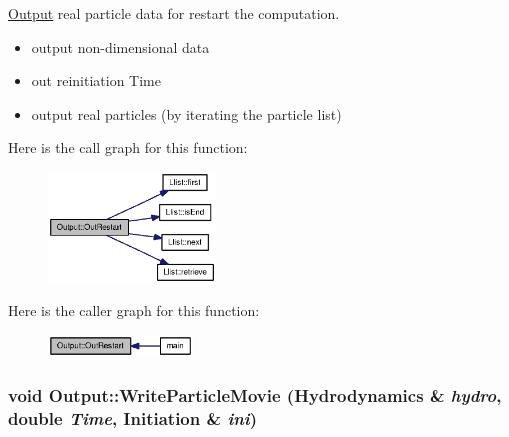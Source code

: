 \hyperlink{classOutput}{Output} real particle data for restart the computation. 



\begin{itemize}
\item output non-dimensional data\end{itemize}


\begin{itemize}
\item out reinitiation Time\end{itemize}


\begin{itemize}
\item output real particles (by iterating the particle list) \end{itemize}


Here is the call graph for this function:\nopagebreak
\begin{figure}[H]
\begin{center}
\leavevmode
\includegraphics[width=126pt]{classOutput_a96aad43762590fc7779d24050c0a151_cgraph}
\end{center}
\end{figure}


Here is the caller graph for this function:\nopagebreak
\begin{figure}[H]
\begin{center}
\leavevmode
\includegraphics[width=109pt]{classOutput_a96aad43762590fc7779d24050c0a151_icgraph}
\end{center}
\end{figure}
\hypertarget{classOutput_3ff4c5c04d9f7e89eb3f36b299256f10}{
\subsubsection[{WriteParticleMovie}]{\setlength{\rightskip}{0pt plus 5cm}void Output::WriteParticleMovie ({\bf Hydrodynamics} \& {\em hydro}, \/  double {\em Time}, \/  {\bf Initiation} \& {\em ini})}}
\label{classOutput_3ff4c5c04d9f7e89eb3f36b299256f10}


